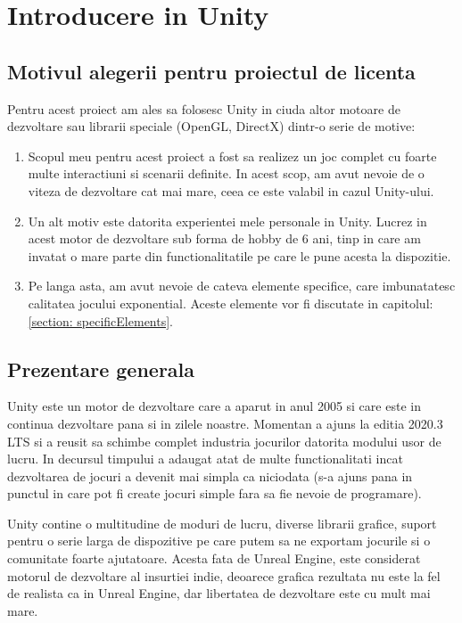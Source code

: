 \documentclass[12pt, a4paper]{article}
\begin{document}
	
	\section{Introducere in Unity}
	
	\subsection{Motivul alegerii pentru proiectul de licenta}
	
	Pentru acest proiect am ales sa folosesc Unity in ciuda altor motoare de dezvoltare sau librarii speciale (OpenGL, DirectX) dintr-o serie de motive:
	
	\begin{enumerate}
		\item Scopul meu pentru acest proiect a fost sa realizez un joc complet cu foarte multe interactiuni si scenarii definite. In acest scop, am avut nevoie de o viteza de dezvoltare cat mai mare, ceea ce este valabil in cazul Unity-ului.
		\item Un alt motiv este datorita experientei mele personale in Unity. Lucrez in acest motor de dezvoltare sub forma de hobby de 6 ani, tinp in care am invatat o mare parte din functionalitatile pe care le pune acesta la dispozitie.
		\item Pe langa asta, am avut nevoie de cateva elemente specifice, care imbunatatesc calitatea jocului exponential. Aceste elemente vor fi discutate in capitolul: \ref{section: specificElements}.
	\end{enumerate}




	
	\subsection{Prezentare generala}
	
	Unity este un motor de dezvoltare care a aparut in anul 2005 si care este in continua dezvoltare pana si in zilele noastre. Momentan a ajuns la editia 2020.3 LTS si a reusit sa schimbe complet industria jocurilor datorita modului usor de lucru. In decursul timpului a adaugat atat de multe functionalitati incat dezvoltarea de jocuri a devenit mai simpla ca niciodata (s-a ajuns pana in punctul in care pot fi create jocuri simple fara sa fie nevoie de programare).
	\newline
	
	Unity contine o multitudine de moduri de lucru, diverse librarii grafice, suport pentru o serie larga de dispozitive pe care putem sa ne exportam jocurile si o comunitate foarte ajutatoare. Acesta fata de Unreal Engine, este considerat motorul de dezvoltare al insurtiei indie, deoarece grafica rezultata nu este la fel de realista ca in Unreal Engine, dar libertatea de dezvoltare este cu mult mai mare.
	\newline
	
\end{document}
